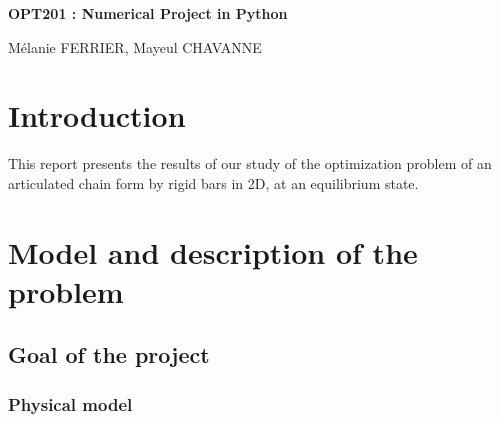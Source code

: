 \documentclass[a4paper]{article}
\begin{document}
\renewcommand{\contentsname}{Table of content}


\begin{titlepage}

\begin{center}
\hspace{100cm}
\huge{\textbf{OPT201 : Numerical Project in Python}}

\vspace{2cm}

\Large{Mélanie FERRIER, Mayeul CHAVANNE}

\vspace{3cm}



\end{center}

\end{titlepage}

\newpage
\tableofcontents
\newpage
\begin{onehalfspace}
\section*{Introduction}

This report presents the results of our study of the optimization problem of an articulated chain form by rigid bars in 2D, at an equilibrium state.

\section{Model and description of the problem}

\subsection{Goal of the project}




\subsubsection{Physical model}



\end{onehalfspace}
\end{document}
